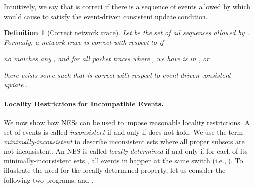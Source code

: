 \documentclass[pldi-cameraready]{sigplanconf}
\newtheorem{definition}{Definition}
\begin{document}
Intuitively, we say that  is correct if there is a sequence of events allowed by 
which would cause  to satisfy the event-driven consistent update condition.


\begin{definition}[Correct network trace]
\label{def:corr_trace}Let  be the set of all sequences allowed by . 
Formally, a network trace  is {\em correct} with respect to  if
\begin{compactitem}
\item no  matches any , and for all packet traces  where , 
we have  is in , or
\item there exists some  such that
 is correct with respect to event-driven consistent update .
\end{compactitem}
\end{definition}



\paragraph*{Locality Restrictions for Incompatible Events.}
\label{sec:locrestr}
We now show how NESs can be used to impose reasonable locality
restrictions. A set of events  is called {\em
  inconsistent} if and only if  does not hold.  We use the term {\em
  minimally-inconsistent} to describe inconsistent sets where all proper subsets are
not inconsistent.
An NES  is called {\em locally-determined} if and only if for each of its
minimally-inconsistent sets , all events in  happen
at the same switch (i.e., ).
To illustrate the need for the locally-determined property, let us
consider the following two programs,  and .
\end{document}
